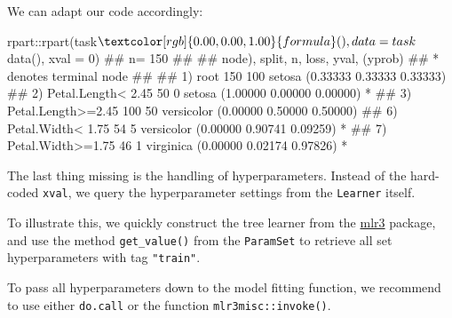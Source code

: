 \documentclass[
  11pt,
  parskip=half,
  DIV=calc,
  BCOR=10mm,
  x11names]{scrbook}
\newenvironment{Shaded}{}{}
\newcommand{\DataTypeTok}[1]{#1}
\newcommand{\DecValTok}[1]{#1}
\newcommand{\KeywordTok}[1]{\textcolor[rgb]{0.00,0.00,1.00}{#1}}
\newcommand{\NormalTok}[1]{#1}
\newcommand{\OperatorTok}[1]{#1}
\newcommand{\StringTok}[1]{\textcolor[rgb]{0.00,0.50,0.50}{#1}}
\begin{document}
We can adapt our code accordingly:

\begin{Shaded}
\begin{Highlighting}[]
\NormalTok{rpart}\OperatorTok{::}\KeywordTok{rpart}\NormalTok{(task}\OperatorTok{$}\KeywordTok{formula}\NormalTok{(), }\DataTypeTok{data =}\NormalTok{ task}\OperatorTok{$}\KeywordTok{data}\NormalTok{(), }\DataTypeTok{xval =} \DecValTok{0}\NormalTok{)}
\NormalTok{## n= 150 }
\NormalTok{## }
\NormalTok{## node), split, n, loss, yval, (yprob)}
\NormalTok{##       * denotes terminal node}
\NormalTok{## }
\NormalTok{## 1) root 150 100 setosa (0.33333 0.33333 0.33333)  }
\NormalTok{##   2) Petal.Length< 2.45 50   0 setosa (1.00000 0.00000 0.00000) *}
\NormalTok{##   3) Petal.Length>=2.45 100  50 versicolor (0.00000 0.50000 0.50000)  }
\NormalTok{##     6) Petal.Width< 1.75 54   5 versicolor (0.00000 0.90741 0.09259) *}
\NormalTok{##     7) Petal.Width>=1.75 46   1 virginica (0.00000 0.02174 0.97826) *}
\end{Highlighting}
\end{Shaded}

The last thing missing is the handling of hyperparameters.
Instead of the hard-coded \texttt{xval}, we query the hyperparameter settings from the \texttt{Learner} itself.

To illustrate this, we quickly construct the tree learner from the \href{https://mlr3.mlr-org.com}{mlr3} package, and use the method \texttt{get\_value()} from the \texttt{ParamSet} to retrieve all set hyperparameters with tag \texttt{"train"}.

\begin{Shaded}
\end{Shaded}

To pass all hyperparameters down to the model fitting function, we recommend to use either \texttt{do.call} or the function \texttt{mlr3misc::invoke()}.
\end{document}
